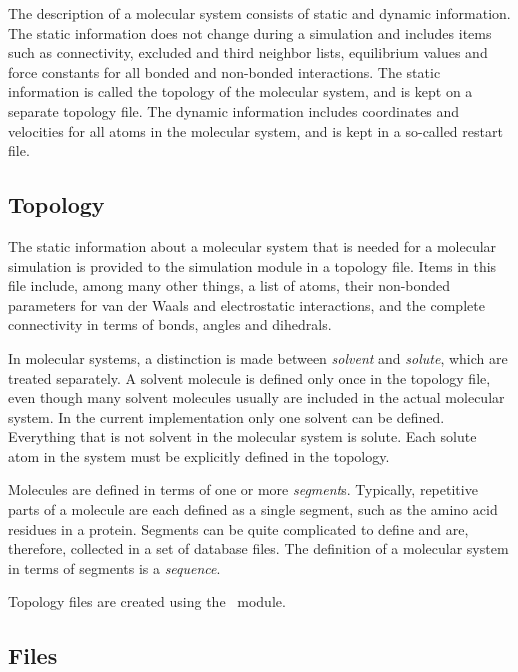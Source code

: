 The description of a molecular system consists of static and dynamic
information. The static information does not change during a
simulation and includes items such as connectivity, excluded and third
neighbor lists, equilibrium values and force constants for all
bonded and non-bonded interactions. The static information is called
the topology of the molecular system, and is kept on a separate
topology file. The dynamic information includes coordinates and
velocities for all atoms in the molecular system, and is kept in a
so-called restart file.

\subsection{Topology}
\label{sec:nwatopology}
The static information about a molecular system that is needed for
a molecular simulation is provided to the simulation module in a
topology file. 
Items in this file include, among many other things, 
a list of atoms, their non-bonded parameters for van der Waals and
electrostatic interactions, and the complete connectivity in terms
of bonds, angles and dihedrals.

In molecular systems, a distinction is made between 
{\it solvent} and {\it solute}, which are treated separately.
A solvent molecule is defined only once in the topology file,
even though many solvent molecules usually are included in the
actual molecular system. In the current implementation only one 
solvent can be defined. Everything that is not solvent in the 
molecular system is solute. Each solute atom in the system must 
be explicitly defined in the topology. 

Molecules are defined in terms of one or more {\it segment}s. 
Typically, repetitive parts of a molecule are each defined as a single
segment, such as the amino acid residues in a protein. 
Segments  can be quite complicated to define and are, therefore, 
collected in a set of database files. 
The definition of a molecular system in terms of segments is a
{\it sequence}.

Topology files are created using the \prepare\ module.

\subsection{Files}
\label{sec:nwafilenames}

